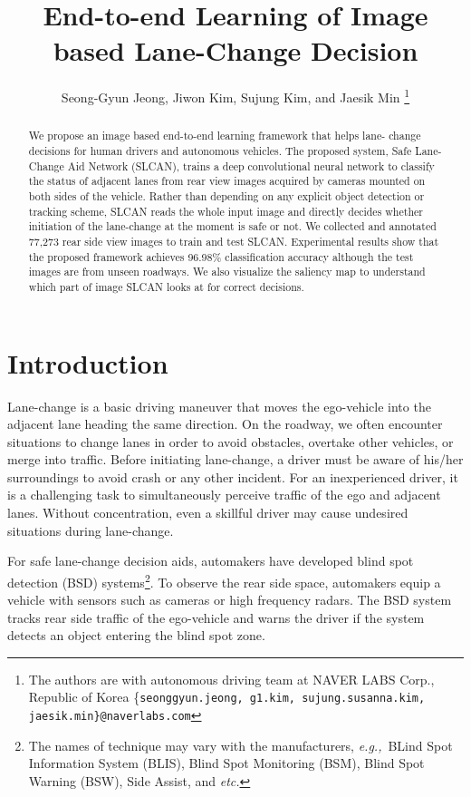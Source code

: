 \documentclass[letterpaper, 10pt, conference]{ieeeconf}
\title{\LARGE \bf
	End-to-end Learning of Image based Lane-Change Decision
}
\author{Seong-Gyun Jeong, Jiwon Kim, Sujung Kim, and Jaesik Min%
\thanks{The authors are with autonomous driving team at NAVER LABS Corp., Republic of Korea 
\{\tt\small{seonggyun.jeong, g1.kim, sujung.susanna.kim, jaesik.min\}@naverlabs.com}}%
}
\newcommand{\eg}{\textit{e.g.,}~}
\newcommand{\etc}{\textit{etc.}}
\begin{document}
\maketitle
\thispagestyle{empty}
\pagestyle{empty}

\begin{abstract}

	We propose an image based end-to-end learning framework that helps lane-%
change decisions for human drivers and autonomous vehicles. The proposed system, 
Safe Lane-Change Aid Network (SLCAN), trains a deep convolutional neural network 
to classify the status of adjacent lanes from rear view images acquired by cameras 
mounted on both sides of the vehicle. Rather than depending on any explicit object
detection or tracking scheme, SLCAN reads the whole input image and directly decides 
whether initiation of the lane-change at the moment is safe or not. We collected and annotated 77,273 rear side view images to train and test SLCAN. Experimental 
results show that the proposed framework achieves 96.98\% classification accuracy 
although the test images are from unseen roadways. We also visualize the saliency 
map to understand which part of image SLCAN looks at for correct decisions.
\end{abstract}

\section{Introduction}
\label{sec:intro}

	Lane-change is a basic driving maneuver that moves the ego-vehicle
into the adjacent lane heading the same direction. On the roadway, we often
encounter situations to change lanes in order to avoid obstacles, overtake  
other vehicles, or merge into traffic. Before initiating lane-change, a driver 
must be aware of his/her surroundings to avoid crash or any other incident. 
For an inexperienced driver, it is a challenging task to simultaneously perceive
traffic of the ego and adjacent lanes. Without concentration, even a skillful 
driver may cause undesired situations during lane-change.

	For safe lane-change decision aids, automakers have developed blind spot detection
(BSD) systems\footnote{The names of technique may vary with the manufacturers, 
\eg BLind Spot Information System (BLIS), Blind Spot Monitoring (BSM), Blind Spot Warning
(BSW), Side Assist, and \etc}. To observe the rear side space, automakers equip a
vehicle with sensors such as cameras or high frequency radars. The BSD system tracks
rear side traffic of the ego-vehicle and warns the driver if the system detects an
object entering the blind spot zone. 
\end{document}
